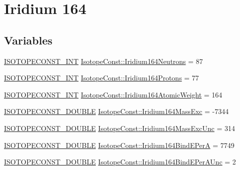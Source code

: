 \hypertarget{group___isotope_const-_iridium-_ir164}{}\section{Iridium 164}
\label{group___isotope_const-_iridium-_ir164}
\subsection*{Variables}
\begin{DoxyCompactItemize}
\item 
\mbox{\hyperlink{group___isotope_const-_macros_ga5f18360b3e99483a35c32d789e62621c}{I\+S\+O\+T\+O\+P\+E\+C\+O\+N\+S\+T\+\_\+\+I\+NT}} \mbox{\hyperlink{group___isotope_const-_iridium-_ir164_gafe56c1e730974eb22f1aac262970c6f3}{Isotope\+Const\+::\+Iridium164\+Neutrons}} = 87
\item 
\mbox{\hyperlink{group___isotope_const-_macros_ga5f18360b3e99483a35c32d789e62621c}{I\+S\+O\+T\+O\+P\+E\+C\+O\+N\+S\+T\+\_\+\+I\+NT}} \mbox{\hyperlink{group___isotope_const-_iridium-_ir164_gafe1b4886f3cfb6f678c6bd303f2ae60a}{Isotope\+Const\+::\+Iridium164\+Protons}} = 77
\item 
\mbox{\hyperlink{group___isotope_const-_macros_ga5f18360b3e99483a35c32d789e62621c}{I\+S\+O\+T\+O\+P\+E\+C\+O\+N\+S\+T\+\_\+\+I\+NT}} \mbox{\hyperlink{group___isotope_const-_iridium-_ir164_ga0d68b8e953358c6fdb4b349413f38fea}{Isotope\+Const\+::\+Iridium164\+Atomic\+Weight}} = 164
\item 
\mbox{\hyperlink{group___isotope_const-_macros_ga8f45a7272ce02c0b4c65c44636ed719a}{I\+S\+O\+T\+O\+P\+E\+C\+O\+N\+S\+T\+\_\+\+D\+O\+U\+B\+LE}} \mbox{\hyperlink{group___isotope_const-_iridium-_ir164_gac3dddfa7dea16567572ae5391c126623}{Isotope\+Const\+::\+Iridium164\+Mass\+Exc}} = -\/7344
\item 
\mbox{\hyperlink{group___isotope_const-_macros_ga8f45a7272ce02c0b4c65c44636ed719a}{I\+S\+O\+T\+O\+P\+E\+C\+O\+N\+S\+T\+\_\+\+D\+O\+U\+B\+LE}} \mbox{\hyperlink{group___isotope_const-_iridium-_ir164_ga27e3a8441d6b7c936442c337470ece2f}{Isotope\+Const\+::\+Iridium164\+Mass\+Exc\+Unc}} = 314
\item 
\mbox{\hyperlink{group___isotope_const-_macros_ga8f45a7272ce02c0b4c65c44636ed719a}{I\+S\+O\+T\+O\+P\+E\+C\+O\+N\+S\+T\+\_\+\+D\+O\+U\+B\+LE}} \mbox{\hyperlink{group___isotope_const-_iridium-_ir164_gac8e57a6a99d63b2ee2a88c7d7e78bf70}{Isotope\+Const\+::\+Iridium164\+Bind\+E\+PerA}} = 7749
\item 
\mbox{\hyperlink{group___isotope_const-_macros_ga8f45a7272ce02c0b4c65c44636ed719a}{I\+S\+O\+T\+O\+P\+E\+C\+O\+N\+S\+T\+\_\+\+D\+O\+U\+B\+LE}} \mbox{\hyperlink{group___isotope_const-_iridium-_ir164_gade70227d278b6d29335c3b6dd207a87d}{Isotope\+Const\+::\+Iridium164\+Bind\+E\+Per\+A\+Unc}} = 2

\end{DoxyCompactItemize}
